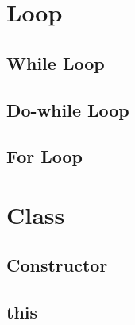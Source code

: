 \documentclass[a4paper]{article}
\begin{document}
\section{Loop}

\subsection{While Loop}

\subsection{Do-while Loop}

\subsection{For Loop}





\section{Class}
\subsection{Constructor}
\subsection{this}
\end{document}
